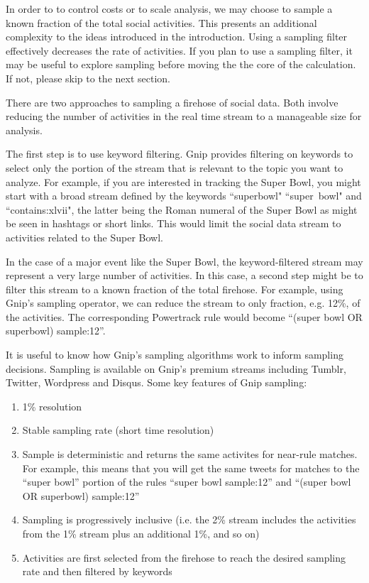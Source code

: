 \documentclass{article}
\begin{document}
In order to to control costs or to scale analysis, we may choose to sample a known fraction of the total social activities. This presents an
additional complexity to the ideas introduced in the introduction. Using a sampling filter effectively decreases the rate of activities. If you
plan to use a sampling filter, it may be useful to explore sampling before moving the the core of the calculation.  
If not, please skip to the next section.

There are two approaches to sampling a firehose of social data. Both involve reducing the number of activities in the 
real time stream to a manageable size for analysis.

The first step is to use keyword filtering.  Gnip provides filtering on keywords to select only the portion of the stream
that is relevant to the topic you want to analyze. For example, if you are interested in tracking the Super Bowl, you 
might start with a broad stream defined by the keywords ``superbowl" ``super~bowl" and ``contains:xlvii", the 
latter being the Roman numeral of the Super Bowl as might be seen in hashtags or short links. This would limit the 
social data stream to activities related to the Super Bowl.

In the case of a major event like the Super Bowl, the keyword-filtered stream may represent a very large number
of activities.  In this case, a second step might be to filter this stream to a known fraction of the total firehose. For 
example, using Gnip's sampling operator, we can reduce the stream to only fraction, e.g. 12\%, of the activities. 
The corresponding Powertrack rule would become  ``(super bowl OR superbowl) sample:12''.

It is useful to know how Gnip's sampling algorithms work to inform sampling decisions.  Sampling is available on
Gnip's premium streams including Tumblr, Twitter, Wordpress and Disqus. Some key features of Gnip sampling:

\begin{enumerate}
	\item 1\% resolution
	\item Stable sampling rate (short time resolution)
	\item Sample is deterministic and returns the same activites for near-rule matches.  For example, this means
	that you will get the same tweets for matches to the ``super bowl'' portion of the rules ``super bowl sample:12'' 
	and ``(super bowl OR superbowl) sample:12''
	\item Sampling is progressively inclusive (i.e. the 2\% stream includes the activities from the 1\% stream plus an 
	additional 1\%,  and so on)
	\item Activities are first selected from the firehose to reach the desired sampling rate and then filtered by keywords 
\end{enumerate}
\end{document}
